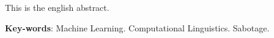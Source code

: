 \begin{resumo}[Abstract]
 This is the english abstract.

 \vspace{\onelineskip}
 
 \noindent 
 \textbf{Key-words}: Machine Learning. Computational Linguistics. Sabotage.
\end{resumo}
